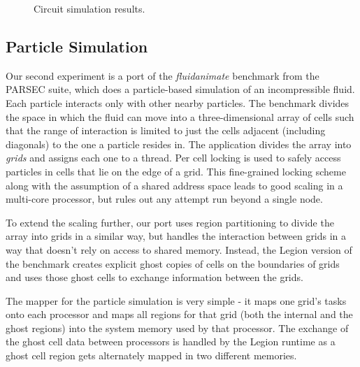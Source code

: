 \begin{figure}
\caption{Circuit simulation results.}
\end{figure}

\subsection{Particle Simulation}
\label{subsec:exp_fluid}

Our second experiment is a port of the \emph{fluidanimate} benchmark from the PARSEC suite\cite{bienia11benchmarking},
which does a particle-based simulation of an incompressible fluid.  Each particle interacts only with other nearby
particles. The benchmark divides the space in which the fluid can move into a three-dimensional array of cells 
such that the range of interaction is limited to just the
cells adjacent (including diagonals) to the one a particle resides in.  The application divides the array 
into {\em grids} and assigns each one to 
a thread.  Per cell locking is used to safely access particles in cells that lie
on the edge of a grid.  This fine-grained locking scheme along with the assumption of a shared address space leads to
good scaling in a multi-core processor, but rules out any attempt run beyond a single node.  

To extend the scaling further, our port uses region partitioning to divide the array into grids in a similar
way, but handles the interaction between grids in a way that doesn't rely on access to shared memory.
Instead, the Legion version of the benchmark creates explicit ghost copies of cells on the boundaries of grids
and uses those ghost cells to exchange information between the grids.

The mapper for the particle simulation is very simple - it maps one grid's tasks onto each processor and
maps all regions for that grid (both the internal and the ghost regions) into the system memory used by that processor.
The exchange of the ghost cell data between processors is handled by the Legion runtime as a ghost cell region
gets alternately mapped in two different memories.

